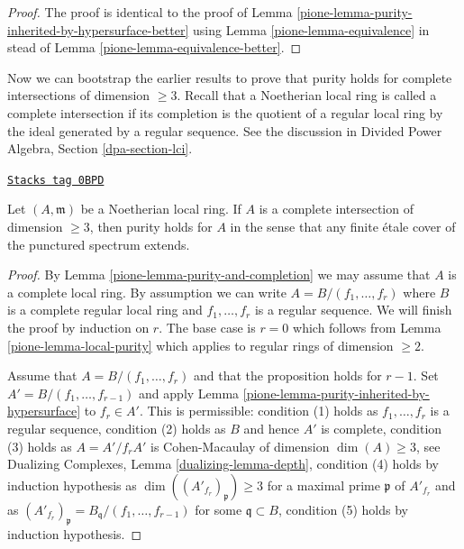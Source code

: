 \begin{proof}

The proof is identical to the proof of
Lemma \ref{pione-lemma-purity-inherited-by-hypersurface-better}
using
Lemma \ref{pione-lemma-equivalence}
in stead of
Lemma \ref{pione-lemma-equivalence-better}.
\end{proof}

Now we can bootstrap the earlier results to prove that
purity holds for complete intersections of dimension $\geq 3$.
Recall that a Noetherian local ring is called a complete
intersection if its completion is the quotient of a
regular local ring by the ideal generated by a regular sequence.
See the discussion in Divided Power Algebra, Section \ref{dpa-section-lci}.

\begin{proposition}
\label{pione-proposition-purity-complete-intersection}
\href{https://stacks.math.columbia.edu/tag/0BPD}{\texttt{Stacks tag 0BPD}}

Let $(A, \mathfrak m)$ be a Noetherian local ring. If $A$ is a
complete intersection of dimension $\geq 3$, then purity
holds for $A$ in the sense that any finite \'etale cover of
the punctured spectrum extends.
\end{proposition}

\begin{proof}

By Lemma \ref{pione-lemma-purity-and-completion} we may assume that $A$ is
a complete local ring. By assumption we can write
$A = B/(f_1, \ldots, f_r)$ where $B$ is a complete regular local
ring and $f_1, \ldots, f_r$ is a regular sequence.
We will finish the proof by induction on $r$.
The base case is $r = 0$ which follows from
Lemma \ref{pione-lemma-local-purity} which applies to
regular rings of dimension $\geq 2$.

\medskip\noindent
Assume that $A = B/(f_1, \ldots, f_r)$ and that the proposition
holds for $r - 1$. Set $A' = B/(f_1, \ldots, f_{r - 1})$ and apply
Lemma \ref{pione-lemma-purity-inherited-by-hypersurface} to $f_r \in A'$.
This is permissible:
condition (1) holds as $f_1, \ldots, f_r$ is a regular sequence,
condition (2) holds as $B$ and hence $A'$ is complete,
condition (3) holds as $A = A'/f_r A'$ is Cohen-Macaulay of dimension
$\dim(A) \geq 3$, see Dualizing Complexes, Lemma \ref{dualizing-lemma-depth},
condition (4) holds by induction hypothesis as
$\dim((A'_{f_r})_\mathfrak p) \geq 3$ for a maximal
prime $\mathfrak p$ of $A'_{f_r}$ and as
$(A'_{f_r})_\mathfrak p = B_\mathfrak q/(f_1, \ldots, f_{r - 1})$
for some $\mathfrak q \subset B$,
condition (5) holds by induction hypothesis.
\end{proof}

